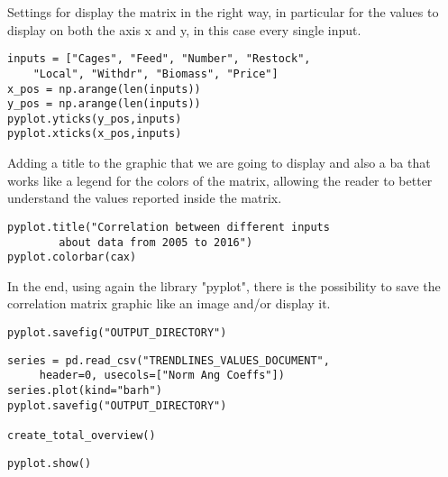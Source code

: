 Settings for display the matrix in the right way, in particular for the values to display on both the axis x and y, in this case every single input.
\begin{lstlisting}
inputs = ["Cages", "Feed", "Number", "Restock",
	"Local", "Withdr", "Biomass", "Price"]
x_pos = np.arange(len(inputs))
y_pos = np.arange(len(inputs))
pyplot.yticks(y_pos,inputs)
pyplot.xticks(x_pos,inputs)
\end{lstlisting}

Adding a title to the graphic that we are going to display and also a ba that works like a legend for the colors of the matrix, allowing the reader to better understand the values reported inside the matrix.
\begin{lstlisting}
pyplot.title("Correlation between different inputs 
		about data from 2005 to 2016")
pyplot.colorbar(cax)
\end{lstlisting}

In the end, using again the library "pyplot", there is the possibility to save the correlation matrix graphic like an image and/or display it.
\begin{lstlisting}
pyplot.savefig("OUTPUT_DIRECTORY")
\end{lstlisting}

\begin{lstlisting}
series = pd.read_csv("TRENDLINES_VALUES_DOCUMENT",
	 header=0, usecols=["Norm Ang Coeffs"])
series.plot(kind="barh")
pyplot.savefig("OUTPUT_DIRECTORY")

create_total_overview()
\end{lstlisting}

\begin{lstlisting}
pyplot.show()
\end{lstlisting}

